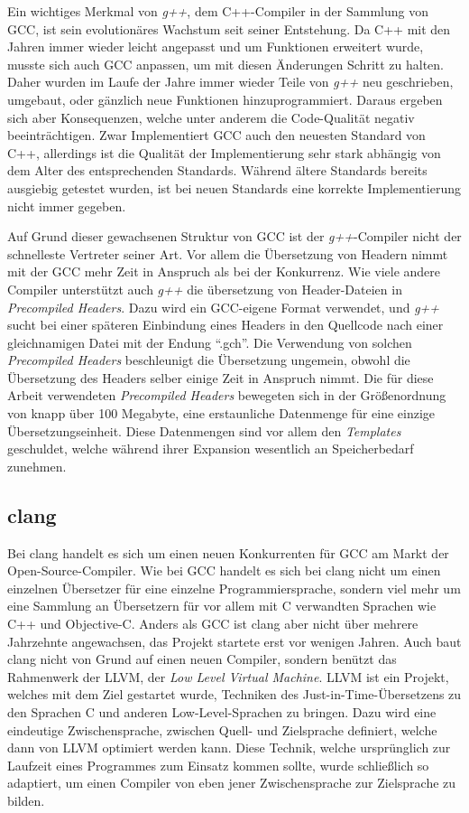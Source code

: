 Ein wichtiges Merkmal von \textit{g++}, dem C++-Compiler in der Sammlung von GCC, ist sein evolutionäres Wachstum seit seiner Entstehung. Da C++ mit den Jahren immer wieder leicht angepasst und um Funktionen
erweitert wurde, musste sich auch GCC anpassen, um mit diesen Änderungen Schritt zu halten. Daher wurden im Laufe der Jahre immer wieder Teile von \textit{g++} neu geschrieben, umgebaut, oder gänzlich
neue Funktionen hinzuprogrammiert. Daraus ergeben sich aber Konsequenzen, welche unter anderem die Code-Qualität negativ beeinträchtigen. Zwar Implementiert GCC auch den neuesten Standard von C++, allerdings
ist die Qualität der Implementierung sehr stark abhängig von dem Alter des entsprechenden Standards. Während ältere Standards bereits ausgiebig getestet wurden, ist bei neuen Standards eine korrekte 
Implementierung nicht immer gegeben. 

Auf Grund dieser gewachsenen Struktur von GCC ist der \textit{g++}-Compiler nicht der schnelleste Vertreter seiner Art. Vor allem die Übersetzung von Headern nimmt mit der GCC mehr Zeit in Anspruch als
bei der Konkurrenz. Wie viele andere Compiler unterstützt auch \textit{g++} die übersetzung von Header-Dateien in \textit{Precompiled Headers}. Dazu wird ein GCC-eigene Format verwendet, und \textit{g++} sucht bei einer
späteren Einbindung eines Headers in den Quellcode nach einer gleichnamigen Datei mit der Endung ``.gch''. Die Verwendung von solchen \textit{Precompiled Headers} beschleunigt die Übersetzung ungemein, 
obwohl die Übersetzung des Headers selber einige Zeit in Anspruch nimmt. Die für diese Arbeit verwendeten \textit{Precompiled Headers} bewegeten sich in der Größenordnung von knapp über 100 Megabyte, 
eine erstaunliche Datenmenge für eine einzige Übersetzungseinheit. Diese Datenmengen sind vor allem den \textit{Templates} geschuldet, welche während ihrer Expansion wesentlich an Speicherbedarf zunehmen.

\subsection{clang}
Bei clang handelt es sich um einen neuen Konkurrenten für GCC am Markt der Open-Source-Compiler. Wie bei GCC handelt es sich bei clang nicht um einen einzelnen Übersetzer für eine einzelne Programmiersprache,
sondern viel mehr um eine Sammlung an Übersetzern für vor allem mit C verwandten Sprachen wie C++ und Objective-C. Anders als GCC ist clang aber nicht über mehrere Jahrzehnte angewachsen, das Projekt
startete erst vor wenigen Jahren. Auch baut clang nicht von Grund auf einen neuen Compiler, sondern benützt das Rahmenwerk der LLVM, der \textit{Low Level Virtual Machine}. LLVM ist ein Projekt, welches
mit dem Ziel gestartet wurde, Techniken des Just-in-Time-Übersetzens zu den Sprachen C und anderen Low-Level-Sprachen zu bringen. Dazu wird eine eindeutige Zwischensprache, zwischen Quell- und Zielsprache
definiert, welche dann von LLVM optimiert werden kann. Diese Technik, welche ursprünglich zur Laufzeit eines Programmes zum Einsatz kommen sollte, wurde schließlich so adaptiert, um einen Compiler von
eben jener Zwischensprache zur Zielsprache zu bilden. 

